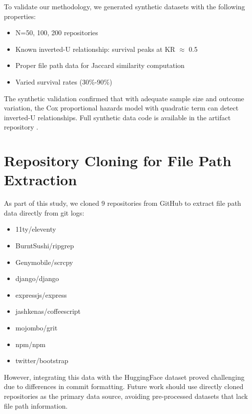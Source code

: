 \documentclass[11pt,letterpaper]{article}
\begin{document}
To validate our methodology, we generated synthetic datasets with the following properties:
\begin{itemize}
    \item N=50, 100, 200 repositories
    \item Known inverted-U relationship: survival peaks at KR $\approx$ 0.5
    \item Proper file path data for Jaccard similarity computation
    \item Varied survival rates (30\%-90\%)
\end{itemize}

The synthetic validation confirmed that with adequate sample size and outcome variation, the Cox proportional hazards model with quadratic term can detect inverted-U relationships. Full synthetic data code is available in the artifact repository \cite{art_pOI-AO_xwHdm}.

\section{Repository Cloning for File Path Extraction}

As part of this study, we cloned 9 repositories from GitHub to extract file path data directly from git logs:
\begin{itemize}
    \item 11ty/eleventy
    \item BurntSushi/ripgrep
    \item Genymobile/scrcpy
    \item django/django
    \item expressjs/express
    \item jashkenas/coffeescript
    \item mojombo/grit
    \item npm/npm
    \item twitter/bootstrap
\end{itemize}

However, integrating this data with the HuggingFace dataset proved challenging due to differences in commit formatting. Future work should use directly cloned repositories as the primary data source, avoiding pre-processed datasets that lack file path information.
\end{document}
